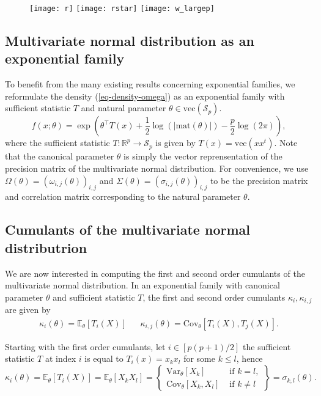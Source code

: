 \begin{figure}[hbtp]
    \centering
    \texttt{[image: r]}
    \texttt{[image: rstar]}
    \texttt{[image: w\_largep]}
\end{figure}

\newpage


\subsection{Multivariate normal distribution as an exponential family}
To benefit from the many existing results concerning exponential families, we reformulate the density (\ref{eq-density-omega}) as an exponential family with sufficient statistic $T$ and natural parameter $\theta \in \text{vec}(\mathcal{S}_p)$. 
\begin{equation} \label{eq-density-theta}
    f(x; \theta) = \exp\left(\theta^\top T(x) + \frac{1}{2}\log\left(|\text{mat}(\theta)|\right) - \frac{p}{2}\log\left(2\pi\right)\right),
\end{equation}
where the sufficient statistic $T : \mathbb{R}^p \rightarrow \mathcal{S}_p$ is given by $T(x) = \text{vec}(xx^t)$. Note that the canonical parameter $\theta$ is simply the vector reprensentation of the precision matrix of the multivariate normal distribution. For convenience, we use $\Omega(\theta) = (\omega_{i,j}(\theta))_{i,j}$ and $\Sigma(\theta) = (\sigma_{i,j}(\theta))_{i,j}$ to be the precision matrix and correlation matrix corresponding to the natural parameter $\theta$.

\subsection{Cumulants of the multivariate normal distributrion}

We are now interested in computing the first and second order cumulants of the multivariate normal distribution. In an exponential family with canonical parameter $\theta$ and sufficient statistic $T$, the first and second order cumulants $\kappa_i, \kappa_{i, j}$ are given by
\begin{align*}
    \kappa_i(\theta) = \mathbb{E}_\theta\left[T_i(X)\right] && \kappa_{i,j}(\theta) = \text{Cov}_\theta\left[T_i(X), T_j(X)\right].
\end{align*}

Starting with the first order cumulants, let $i \in [p(p+1)/2]$ the sufficient statistic $T$ at index $i$ is equal to $T_i(x) = x_kx_l$ for some $k \leq l$, hence
\begin{equation*}
    \kappa_i(\theta) 
    = \mathbb{E}_\theta\left[T_i(X)\right]
    = \mathbb{E}_\theta\left[X_kX_l  \right]
    = \left\{
        \begin{array}{cc}
            \text{Var}_\theta[X_k]      & \text{ if } k = l,\\
            \text{Cov}_\theta[X_k, X_l] & \text{ if } k \neq l
        \end{array}
    \right\}
    = \sigma_{k, l}(\theta).
\end{equation*}

